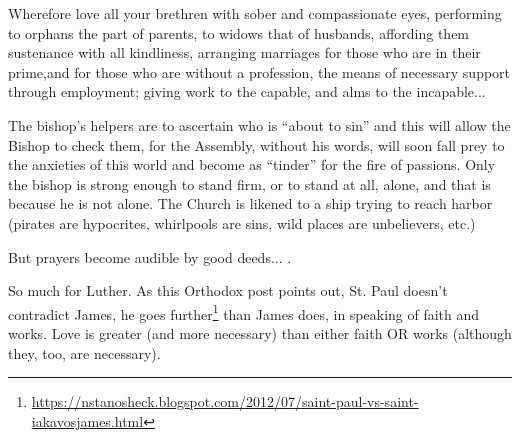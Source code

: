\begin{quotex}
Wherefore love all your brethren with sober and compassionate eyes, performing to orphans the part of parents, to widows that of husbands, affording them sustenance with all kindliness, arranging marriages for those who are in their prime,and for those who are without a profession, the means of necessary support through employment; giving work to the capable, and alms to the incapable... 
\end{quotex}

The bishop's helpers are to ascertain who is ``about to sin'' and this will allow the Bishop to check them, for the Assembly, without his words, will soon fall prey to the anxieties of this world and become as ``tinder'' for the fire of passions. Only the bishop is strong enough to stand firm, or to stand at all, alone, and that is because he is not alone. The Church is likened to a ship trying to reach harbor (pirates are hypocrites, whirlpools are sins, wild places are unbelievers, etc.)

\begin{quotex}
But prayers become audible by good deeds... .
\end{quotex}


So much for Luther. As this Orthodox post points out, St. Paul doesn't contradict James, he goes further\footnote{\url{https://nstanosheck.blogspot.com/2012/07/saint-paul-vs-saint-iakavosjames.html}} than James does, in speaking of faith and works. Love is greater (and more necessary) than either faith OR works (although they, too, are necessary).

